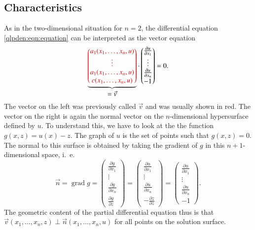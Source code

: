 \subsection{Characteristics}
As in the two-dimensional situation for $n=2$, the differential
equation \eqref{qlpden:eqn:equation} can be interpreted as the
vector equation
\[
\underbrace{
{\color{red}
\begin{pmatrix}
a_1(x_1,\dots,x_n,u)\\
\vdots \\
a_1(x_1,\dots,x_n,u)\\
c(x_1,\dots,x_n,u)
\end{pmatrix}
}}_{\displaystyle = \vec{v}}
\cdot
\begin{pmatrix}
\frac{\partial u}{\partial x_1}\\
\vdots \\
\frac{\partial u}{\partial x_n}\\
-1
\end{pmatrix}
=
0.
\]
The vector on the left was previously called $\vec{v}$ and was usually
shown in {\color{red}red}.
The vector on the right is again the normal vector on the $n$-dimensional
hypersurface defined by $u$.
To understand this, we have to look at the the function
$
g(x,z) = u(x) - z.
$
The graph of $u$ is the set of points such that $g(x,z) = 0$.
The normal to this surface is obtained by taking the gradient of $g$ in
this $n+1$-dimensional space, i.~e.
\begin{equation}
\vec{n}
=
\operatorname{grad} g
=
\begin{pmatrix}
\frac{\partial g}{\partial x_1}\\
\vdots \\
\frac{\partial g}{\partial x_n}\\
\frac{\partial g}{\partial z}
\end{pmatrix}
=
\begin{pmatrix}
\frac{\partial u}{\partial x_1}\\
\vdots \\
\frac{\partial u}{\partial x_n}\\
-\frac{\partial z}{\partial z}
\end{pmatrix}
=
\begin{pmatrix}
\frac{\partial u}{\partial x_1}\\
\vdots \\
\frac{\partial u}{\partial x_n}\\
-1
\end{pmatrix}.
\end{equation}
The geometric content of the partial differential equation thus is that
$\vec{v}(x_1,\dots,x_n,z)\perp \vec{n}(x_1,\dots,x_n,u)$ for all points
on the solution surface.

